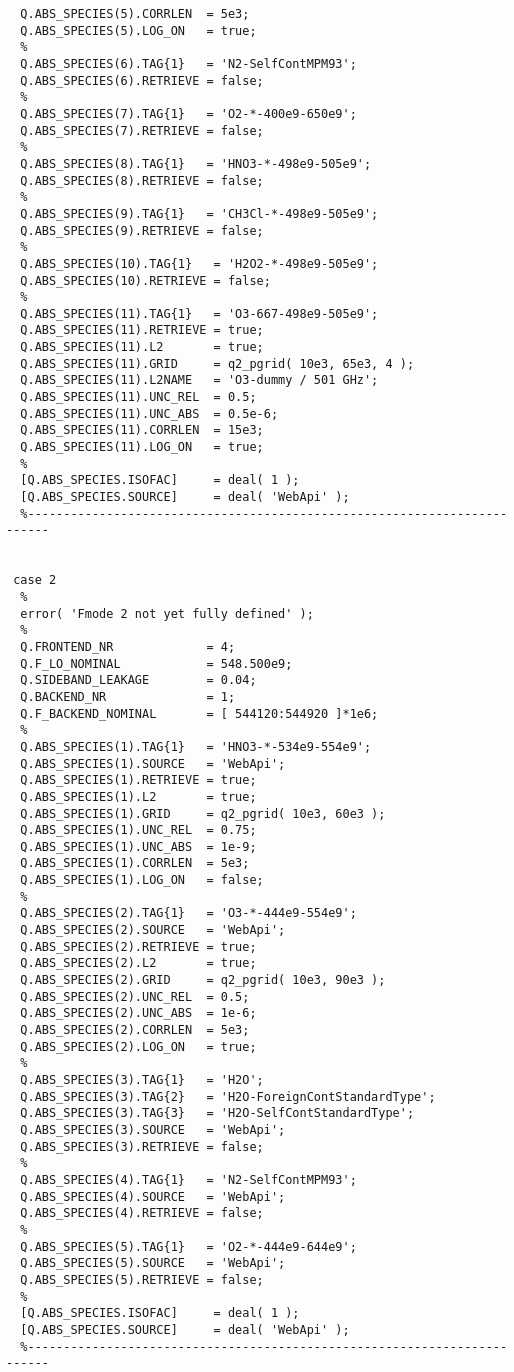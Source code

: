 \begin{verbatim}
  Q.ABS_SPECIES(5).CORRLEN  = 5e3;
  Q.ABS_SPECIES(5).LOG_ON   = true;
  %
  Q.ABS_SPECIES(6).TAG{1}   = 'N2-SelfContMPM93';
  Q.ABS_SPECIES(6).RETRIEVE = false;
  %
  Q.ABS_SPECIES(7).TAG{1}   = 'O2-*-400e9-650e9';
  Q.ABS_SPECIES(7).RETRIEVE = false;
  %
  Q.ABS_SPECIES(8).TAG{1}   = 'HNO3-*-498e9-505e9';
  Q.ABS_SPECIES(8).RETRIEVE = false;
  %
  Q.ABS_SPECIES(9).TAG{1}   = 'CH3Cl-*-498e9-505e9';
  Q.ABS_SPECIES(9).RETRIEVE = false;
  %
  Q.ABS_SPECIES(10).TAG{1}   = 'H2O2-*-498e9-505e9';
  Q.ABS_SPECIES(10).RETRIEVE = false;
  %
  Q.ABS_SPECIES(11).TAG{1}   = 'O3-667-498e9-505e9';
  Q.ABS_SPECIES(11).RETRIEVE = true;
  Q.ABS_SPECIES(11).L2       = true;
  Q.ABS_SPECIES(11).GRID     = q2_pgrid( 10e3, 65e3, 4 );
  Q.ABS_SPECIES(11).L2NAME   = 'O3-dummy / 501 GHz';
  Q.ABS_SPECIES(11).UNC_REL  = 0.5;
  Q.ABS_SPECIES(11).UNC_ABS  = 0.5e-6;
  Q.ABS_SPECIES(11).CORRLEN  = 15e3;
  Q.ABS_SPECIES(11).LOG_ON   = true;
  %
  [Q.ABS_SPECIES.ISOFAC]     = deal( 1 );  
  [Q.ABS_SPECIES.SOURCE]     = deal( 'WebApi' );
  %-------------------------------------------------------------------------

    
 case 2
  %
  error( 'Fmode 2 not yet fully defined' );
  %
  Q.FRONTEND_NR             = 4;
  Q.F_LO_NOMINAL            = 548.500e9;
  Q.SIDEBAND_LEAKAGE        = 0.04;
  Q.BACKEND_NR              = 1;
  Q.F_BACKEND_NOMINAL       = [ 544120:544920 ]*1e6;
  %
  Q.ABS_SPECIES(1).TAG{1}   = 'HNO3-*-534e9-554e9';
  Q.ABS_SPECIES(1).SOURCE   = 'WebApi';
  Q.ABS_SPECIES(1).RETRIEVE = true;
  Q.ABS_SPECIES(1).L2       = true;
  Q.ABS_SPECIES(1).GRID     = q2_pgrid( 10e3, 60e3 );
  Q.ABS_SPECIES(1).UNC_REL  = 0.75;
  Q.ABS_SPECIES(1).UNC_ABS  = 1e-9;
  Q.ABS_SPECIES(1).CORRLEN  = 5e3;
  Q.ABS_SPECIES(1).LOG_ON   = false;
  %
  Q.ABS_SPECIES(2).TAG{1}   = 'O3-*-444e9-554e9';
  Q.ABS_SPECIES(2).SOURCE   = 'WebApi';
  Q.ABS_SPECIES(2).RETRIEVE = true;
  Q.ABS_SPECIES(2).L2       = true;
  Q.ABS_SPECIES(2).GRID     = q2_pgrid( 10e3, 90e3 );
  Q.ABS_SPECIES(2).UNC_REL  = 0.5;
  Q.ABS_SPECIES(2).UNC_ABS  = 1e-6;
  Q.ABS_SPECIES(2).CORRLEN  = 5e3;
  Q.ABS_SPECIES(2).LOG_ON   = true;
  %
  Q.ABS_SPECIES(3).TAG{1}   = 'H2O';
  Q.ABS_SPECIES(3).TAG{2}   = 'H2O-ForeignContStandardType';
  Q.ABS_SPECIES(3).TAG{3}   = 'H2O-SelfContStandardType';
  Q.ABS_SPECIES(3).SOURCE   = 'WebApi';
  Q.ABS_SPECIES(3).RETRIEVE = false;
  %
  Q.ABS_SPECIES(4).TAG{1}   = 'N2-SelfContMPM93';
  Q.ABS_SPECIES(4).SOURCE   = 'WebApi';
  Q.ABS_SPECIES(4).RETRIEVE = false;
  %
  Q.ABS_SPECIES(5).TAG{1}   = 'O2-*-444e9-644e9';
  Q.ABS_SPECIES(5).SOURCE   = 'WebApi';
  Q.ABS_SPECIES(5).RETRIEVE = false;
  %
  [Q.ABS_SPECIES.ISOFAC]     = deal( 1 );  
  [Q.ABS_SPECIES.SOURCE]     = deal( 'WebApi' );
  %-------------------------------------------------------------------------


\end{verbatim}

